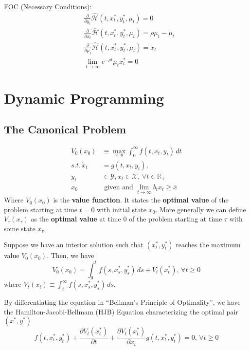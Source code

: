 FOC (Necessary Conditions): \begin{align}
     & \frac{\partial }{\partial y_t}\hat{\mathcal{H}}(t,x_t^*, y_t^*, \mu_t) = 0                        \\
     & \frac{\partial }{\partial x_t}\hat{\mathcal{H}}(t,x_t^*, y_t^*, \mu_t) = \rho \mu_t - \dot{\mu}_t \\
     & \frac{\partial }{\partial \mu_t}\hat{\mathcal{H}}(t,x_t^*, y_t^*,\mu_t) = \dot{x}_t               \\
     & \lim_{t \to \infty} e^{-\rho t}\mu_t x_t^* = 0
\end{align}

\section{Dynamic Programming}

\subsection{The Canonical Problem}
\begin{align}
    V_0(x_0)          & \equiv \max_{x,y} \int_{0}^{\infty} f(t,x_t,y_t) \, dt              \\
    s.t. \, \dot{x}_t & = g(t,x_t,y_t),                                                     \\
    y_t               & \in \mathcal{Y}, x_t \in \mathcal{X}, \, \forall t \in \mathbb{R}_+ \\
    x_0               & \text{ given and } \lim_{t \to \infty} b_tx_t \geq \bar{x}
\end{align}
Where $V_0(x_0)$ is the \textbf{value function}. It states the \textbf{optimal value} of the problem starting at time $t = 0$ with initial state $x_0$. More generally we can define $V_\tau(x_\tau)$ as the \textbf{optimal value} at time $0$ of the problem starting at time $\tau$ with some state $x_\tau$.

\begin{theorem}
    Suppose we have an interior solution such that $(x_t^*, y_t^*)$ reaches the maximum value $V_0(x_0)$. Then, we have \[
        V_0(x_0) = \int_{0}^{t} f(s,x_s^*,y_s^*)  \, ds + V_t(x_t^*), \, \forall t \geq 0
    \] where $V_t(x_t) \equiv \int_{t}^{\infty } f(s,x_s^*, y_s^*) \, ds$.
\end{theorem}

\begin{definition} By differentiating the equation in ``Bellman's Principle of Optimality'', we have the Hamilton-Jacobi-Bellmam (HJB) Equation characterizing the optimal pair $(x^*,y^*)$
    \[
        f(t,x_t^*,y_t^*) + \frac{\partial V_t(x_t^*)}{\partial t} + \frac{\partial V_t(x_t^*)}{\partial x_t}g(t,x_t^*,y_t^*) = 0, \, \forall t \geq 0
    \]
\end{definition}


